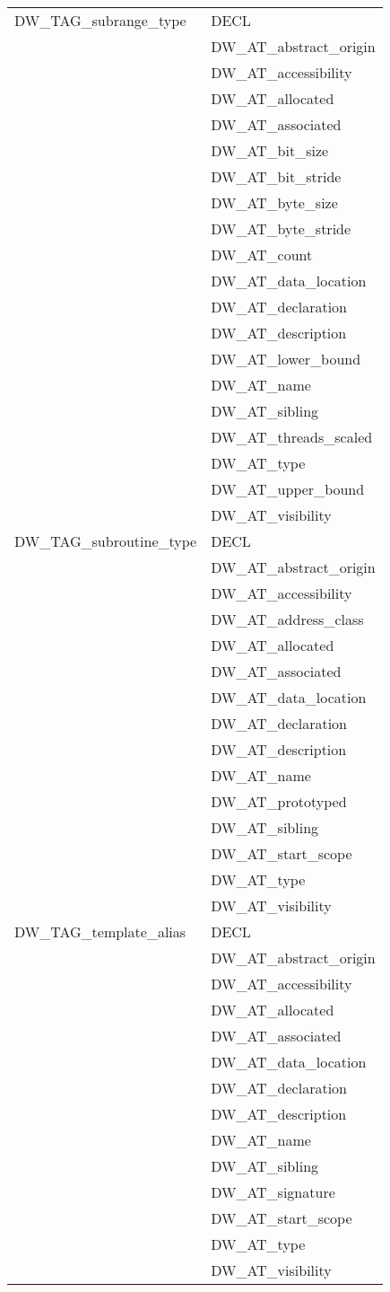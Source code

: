\begin{longtable}{l|p{8cm}}
DW\_TAG\_subrange\_type
&DECL  \\
&DW\_AT\_abstract\_origin  \\
&DW\_AT\_accessibility  \\
&DW\_AT\_allocated  \\
&DW\_AT\_associated  \\
&DW\_AT\_bit\_size  \\
&DW\_AT\_bit\_stride  \\
&DW\_AT\_byte\_size  \\
&DW\_AT\_byte\_stride  \\
&DW\_AT\_count  \\
&DW\_AT\_data\_location  \\
&DW\_AT\_declaration  \\
&DW\_AT\_description  \\
&DW\_AT\_lower\_bound  \\
&DW\_AT\_name  \\
&DW\_AT\_sibling  \\
&DW\_AT\_threads\_scaled  \\
&DW\_AT\_type  \\
&DW\_AT\_upper\_bound  \\
&DW\_AT\_visibility  \\

DW\_TAG\_subroutine\_type
&DECL  \\
&DW\_AT\_abstract\_origin  \\
&DW\_AT\_accessibility  \\
&DW\_AT\_address\_class  \\
&DW\_AT\_allocated  \\
&DW\_AT\_associated  \\
&DW\_AT\_data\_location  \\
&DW\_AT\_declaration  \\
&DW\_AT\_description  \\
&DW\_AT\_name  \\
&DW\_AT\_prototyped  \\
&DW\_AT\_sibling  \\
&DW\_AT\_start\_scope  \\
&DW\_AT\_type  \\
&DW\_AT\_visibility  \\

DW\_TAG\_template\_alias
&DECL   \\
&DW\_AT\_abstract\_origin   \\
&DW\_AT\_accessibility   \\
&DW\_AT\_allocated   \\
&DW\_AT\_associated   \\
&DW\_AT\_data\_location   \\
&DW\_AT\_declaration   \\
&DW\_AT\_description   \\
&DW\_AT\_name   \\
&DW\_AT\_sibling   \\
&DW\_AT\_signature   \\
&DW\_AT\_start\_scope   \\
&DW\_AT\_type   \\
&DW\_AT\_visibility   \\


\end{longtable}
